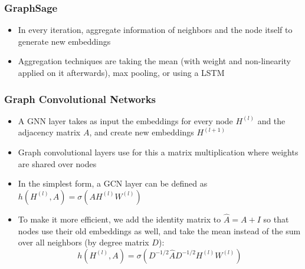 \subsubsection{GraphSage}
\begin{itemize}
	\item In every iteration, aggregate information of neighbors and the node itself to generate new embeddings
	\item Aggregation techniques are taking the mean (with weight and non-linearity applied on it afterwards), max pooling, or using a LSTM
\end{itemize}
\subsubsection{Graph Convolutional Networks}
\begin{itemize}
	\item A GNN layer takes as input the embeddings for every node $H^{(l)}$ and the adjacency matrix $A$, and create new embeddings $H^{(l+1)}$
	\item Graph convolutional layers use for this a matrix multiplication where weights are shared over nodes
	\item In the simplest form, a GCN layer can be defined as $h(H^{(l)}, A) = \sigma\left(A H^{(l)} W^{(l)}\right)$
	\item To make it more efficient, we add the identity matrix to $\hat{A} = A + I$ so that nodes use their old embeddings as well, and take the mean instead of the sum over all neighbors (by degree matrix $D$):
	$$h(H^{(l)}, A) = \sigma\left(D^{-1/2}\hat{A}D^{-1/2} H^{(l)} W^{(l)}\right)$$
\end{itemize}